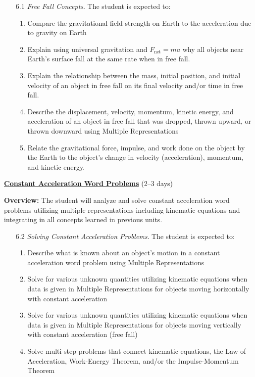 \documentclass[dvipsnames]{article}
\begin{document}
\begin{enumerate}
    \item[6.1] \textit{Free Fall Concepts}. The student is expected to:
    \begin{enumerate}
        \item Compare the gravitational field strength on Earth to the acceleration due to gravity on Earth
        \item Explain using universal gravitation and $F_\mathrm{net}=ma$ why all objects near Earth's surface fall at the same rate when in free fall.
        \item Explain the relationship between the mass, initial position, and initial velocity of an object in free fall on its final velocity and/or time in free fall.
        \item Describe the displacement, velocity, momentum, kinetic energy, and acceleration of an object in free fall that was dropped, thrown upward, or thrown downward using Multiple Representations
        \item Relate the gravitational force, impulse, and work done on the object by the Earth to the object's change in velocity (acceleration), momentum, and kinetic energy.
    \end{enumerate}
\end{enumerate}

\textbf{\underline{Constant Acceleration Word Problems}}  (2--3 days)

\textbf{Overview:} The student will analyze and solve constant acceleration word problems utilizing multiple representations including kinematic equations and integrating in all concepts learned in previous units.

\begin{enumerate}
    \item[6.2] \textit{Solving Constant Acceleration Problems}. The student is expected to:
    \begin{enumerate}
        \item Describe what is known about an object's motion in a constant acceleration word problem using Multiple Representations
        \item Solve for various unknown quantities utilizing kinematic equations when data is given in Multiple Representations for objects moving horizontally with constant acceleration
        \item Solve for various unknown quantities utilizing kinematic equations when data is given in Multiple Representations for objects moving vertically with constant acceleration (free fall)
        \item Solve multi-step problems that connect kinematic equations, the Law of Acceleration, Work-Energy Theorem, and/or the Impulse-Momentum Theorem
    \end{enumerate}
\end{enumerate}
\end{document}
